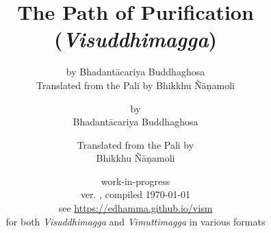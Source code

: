 


	\title{The Path of Purification \\ (\emph{Visuddhimagga})}
	\date{work-in-progress \\ ver. \vismCommitHref, compiled \today \\ see \url{https://edhamma.github.io/vism}  \\ for both \emph{Visuddhimagga} and \emph{Vimuttimagga} in various formats}
	\ifplastex
		\author{by Bhadantācariya Buddhaghosa \\ Translated from the Pali by Bhikkhu Ñāṇamoli}
	\else
		\author{by \\ Bhadantācariya Buddhaghosa \and Translated from the Pali by \\ Bhikkhu Ñāṇamoli}
	\fi
	\maketitle

	\frontmatter
		\bgroup
			\ifplastex\else\renewcommand{\baselinestretch}{0.2}\normalsize\fi
			\tableofcontents
		\egroup
		


